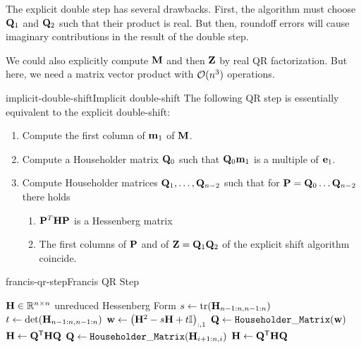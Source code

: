 \begin{remark}
  The explicit double step has several drawbacks. First, the algorithm
  must choose $\mathbf Q_1$ and $\mathbf Q_2$ such that their product is
  real. But then, roundoff errors will cause imaginary contributions
  in the result of the double step.

  We could also explicitly compute $\mathbf M$ and then $\mathbf Z$ by real QR
  factorization. But here, we need a matrix vector product with
  $\mathcal O(n^3)$ operations.
\end{remark}

\begin{Theorem}{implicit-double-shift}{Implicit double-shift}
  The following QR step is essentially equivalent to the explicit double-shift:
  \begin{enumerate}
  \item Compute the first column of $\mathbf m_1$ of $\mathbf M$.
  \item Compute a Householder matrix $\mathbf Q_0$ such that $\mathbf Q_0\mathbf m_1$ is a multiple of $\mathbf e_1$.
  \item Compute Householder matrices $\mathbf Q_1,\dots,\mathbf Q_{n-2}$ such
    that for $\mathbf P = \mathbf Q_0\dots\mathbf Q_{n-2}$ there holds
    \begin{enumerate}
    \item $\mathbf P^T\mathbf H\mathbf P$ is a Hessenberg matrix
    \item The first columns of $\mathbf P$ and of $\mathbf Z = \mathbf Q_1\mathbf Q_2$
      of the explicit shift algorithm coincide.
    \end{enumerate}
  \end{enumerate}
\end{Theorem}

\begin{Algorithm*}{francis-qr-step}{Francis QR Step}
  \begin{algorithmic}[1]
    \Require \( \mathbf H \in \mathbb R^{n\times n}\) unreduced Hessenberg Form
    \State \( s \gets \operatorname{tr}(\mathbf H_{n-1:n, n-1:n})\)
    \State \( t \gets \det(\mathbf H_{n-1:n, n-1:n})\)
    \State \(\mathbf w \gets \left(\mathbf H^2 - s \mathbf H + t \mathbb I\right)_{:,1}\)
    \State \(\mathbf Q \gets \mathtt{Householder\_Matrix}(\mathbf w)\)
    \State \( \mathbf H \gets \mathbf Q^\mathsf{T} \mathbf H \mathbf Q\)
      \State \(\mathbf Q \gets \mathtt{Householder\_Matrix}(\mathbf H_{i+1:n,i})\)
      \State \( \mathbf H \gets \mathbf Q^\mathsf{T} \mathbf H \mathbf Q\)
    \EndFor
  \end{algorithmic}
\end{Algorithm*}

